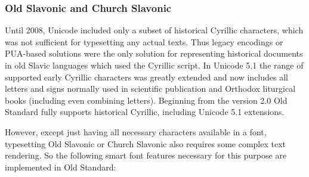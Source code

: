 \documentclass[12pt,a4paper,openany]{book}
\begin{document}
\subsubsection{Old Slavonic and Church Slavonic}

Until 2008, Unicode included only a subset of historical Cyrillic
characters, which was not sufficient for typesetting any actual texts.
Thus legacy encodings or PUA-based solutions were the only solution for 
representing historical documents in old Slavic languages which used
the Cyrillic script. In Unicode 5.1 the range of supported early 
Cyrillic characters was greatly extended and now includes all letters
and signs normally used in scientific publication and Orthodox liturgical 
books (including even combining letters). Beginning from the version
2.0 Old Standard fully supports historical Cyrillic, including Unicode
5.1 extensions.

However, except just having all necessary characters available in a font,
typesetting Old Slavonic or Church Slavonic also requires some complex
text rendering. So the following smart font features necessary for this
purpose are implemented in Old Standard:
\end{document}
